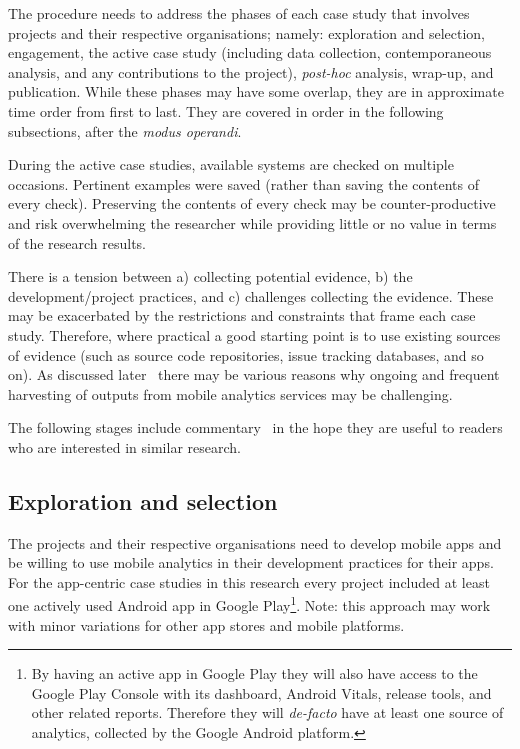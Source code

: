 The procedure needs to address the phases of each case study that involves projects and their respective organisations; namely: exploration and selection, engagement, the active case study (including data collection, contemporaneous analysis, and any contributions to the project), \emph{post-hoc} analysis, wrap-up, and publication. While these phases may have some overlap, they are in approximate time order from first to last. They are covered in order in the following subsections, after the \emph{modus operandi}.



During the active case studies, available systems are checked on multiple occasions. Pertinent examples were saved (rather than saving the contents of every check). Preserving the contents of every check may be counter-productive and risk overwhelming the researcher while providing little or no value in terms of the research results. 

There is a tension between a) collecting potential evidence, b) the development/project practices, and c) challenges collecting the evidence. These may be exacerbated by the restrictions and constraints that frame each case study. Therefore, where practical a good starting point is to use existing sources of evidence (such as source code repositories, issue tracking databases, and so on). As discussed later~ 
there may be various reasons why ongoing and frequent harvesting of outputs from mobile analytics services may be challenging.


The following stages include commentary~ in the hope they are useful to readers who are interested in similar research.

\subsection{Exploration and selection}
The projects and their respective organisations need to develop mobile apps and be willing to use mobile analytics in their development practices for their apps. For the app-centric case studies in this research every project included at least one actively used Android app in Google Play\footnote{By having an active app in Google Play they will also have access to the Google Play Console with its dashboard, Android Vitals, release tools, and other related reports. Therefore they will \emph{de-facto} have at least one source of analytics, collected by the Google Android platform.}. Note: this approach may work with minor variations for other app stores and mobile platforms.


